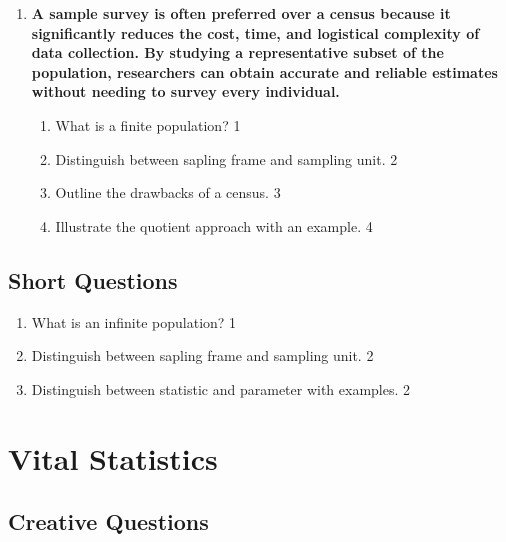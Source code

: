 \documentclass[a4paper,oneside, margin=1.4in]{book}
\begin{document}
\begin{enumerate}
\begin{enumerate}
    \item  
	Outline the steps in a sample survey. \hfill 3
    \item
	Illustrate the remainder approach with an example. \hfill 4
  \end{enumerate}
  
 \item
  \textbf{A sample survey is often preferred over a census because it significantly reduces the cost, time, and logistical complexity of data collection. By studying a representative subset of the population, researchers can obtain accurate and reliable estimates without needing to survey every individual.}

  
  \begin{enumerate}
    \item
	What is a finite population? \hfill 1
    \item
	Distinguish between sapling frame and sampling unit. \hfill 2

    \item  
	Outline the drawbacks of a census. \hfill 3
    \item
	Illustrate the quotient approach with an example. \hfill 4
  \end{enumerate}
    
  
  \end{enumerate}
\section{Short Questions}

 \begin{enumerate}
	\item What is an infinite population? \hfill 1
	\item Distinguish between sapling frame and sampling unit. \hfill 2
	\item Distinguish between statistic and parameter with examples. \hfill 2
 \end{enumerate}
\chapter{Vital Statistics} 
\section{Creative Questions}
\end{document}
